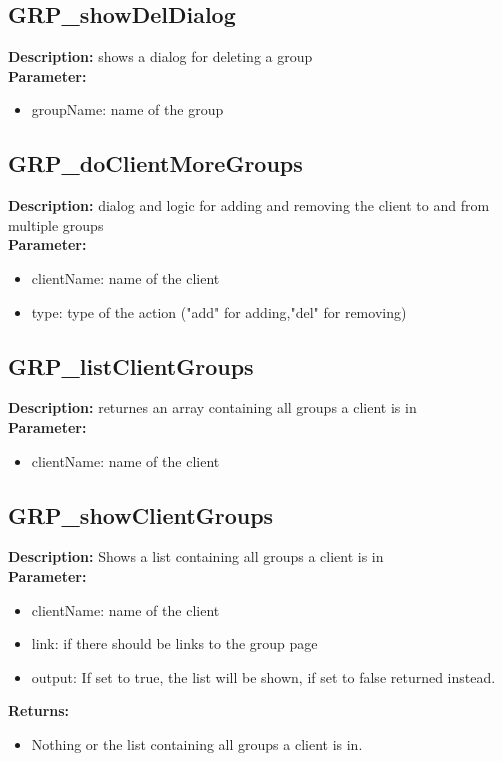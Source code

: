\subsection{GRP\_showDelDialog}
\textbf{Description:} shows a dialog for deleting a group\\
\textbf{Parameter:}
\begin{itemize}
\item groupName: name of the group
\end{itemize}

\subsection{GRP\_doClientMoreGroups}
\textbf{Description:} dialog and logic for adding and removing the client to and from multiple groups\\
\textbf{Parameter:}
\begin{itemize}
\item clientName: name of the client
\item type: type of the action ("add" for adding,"del" for removing)
\end{itemize}

\subsection{GRP\_listClientGroups}
\textbf{Description:} returnes an array containing all groups a client is in\\
\textbf{Parameter:}
\begin{itemize}
\item clientName: name of the client
\end{itemize}

\subsection{GRP\_showClientGroups}
\textbf{Description:} Shows a list containing all groups a client is in\\
\textbf{Parameter:}
\begin{itemize}
\item clientName: name of the client
\item link: if there should be links to the group page
\item output: If set to true, the list will be shown, if set to false returned instead.
\end{itemize}
\textbf{Returns:}
\begin{itemize}
\item Nothing or the list containing all groups a client is in.
\end{itemize}

